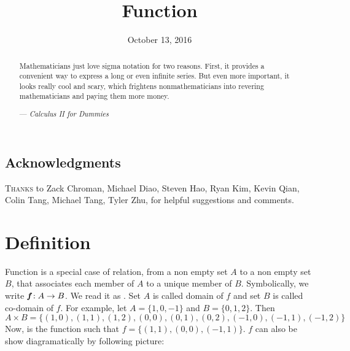 \documentclass[letterpaper,11pt]{scrartcl}
\begin{document}
\title{Function}
\date{October 13, 2016}
\maketitle

\begin{abstract}
	\sffamily\small
	Mathematicians just love sigma notation for two reasons.
	First, it provides a convenient way to express a long or even infinite series.
	But even more important, it looks really cool and scary,
	which frightens nonmathematicians into revering mathematicians
	and paying them more money.

	\medskip
	
	--- \emph{Calculus II for Dummies} %
\end{abstract}
\subsection*{Acknowledgments}
\textsc{Thanks} to Zack Chroman, Michael Diao,
Steven Hao, Ryan Kim, Kevin Qian, Colin Tang, Michael Tang, Tyler Zhu,
for helpful suggestions and comments.

\tableofcontents
\eject
\section{Definition}
Function is a special case of relation, from a non empty set $A$ to a non empty set $B$, that associates each member of $A$ to a unique member of $B$. Symbolically, we write $\textit{\textbf{f}} : A \rightarrow B$. We read it as .
Set $A$ is called domain of $f$ and set $B$ is called co-domain of $f$.
For example, let $A = \{1, 0, -1\}$ and $B=\{0, 1, 2\}$. Then $A\times B = \{(1, 0), (1, 1), (1, 2), (0, 0), (0, 1), (0, 2), (-1, 0),(-1, 1), (-1, 2)\}$
Now,  is the function such that $f = \{(1, 1), (0, 0), (-1, 1)\}$. $f$ can also be show diagramatically by following picture:

\begin{figure}[h]
 \centering
\end{figure}
\end{document}
